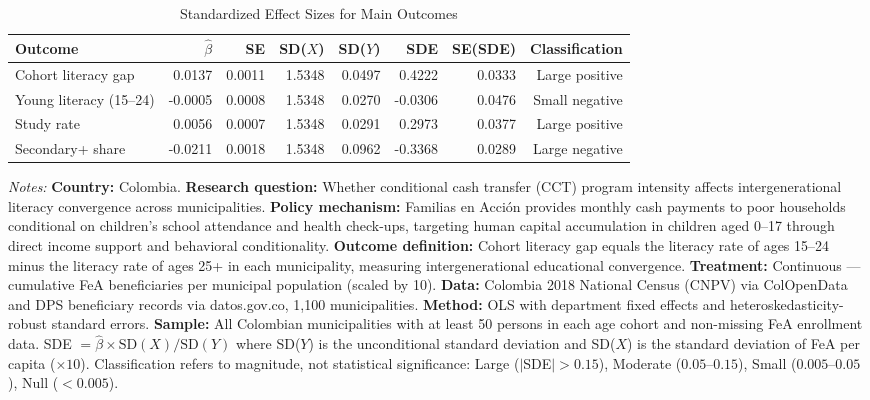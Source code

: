 \begin{table}[H]
\centering
\caption{Standardized Effect Sizes for Main Outcomes}
\label{tab:sde}
\begin{adjustbox}{max width=\textwidth}
\begin{threeparttable}
\begin{tabular}{lrrrrrrr}
\toprule
Outcome & $\hat{\beta}$ & SE & SD($X$) & SD($Y$) & SDE & SE(SDE) & Classification \\
\midrule
Cohort literacy gap & 0.0137 & 0.0011 & 1.5348 & 0.0497 & 0.4222 & 0.0333 & Large positive \\
Young literacy (15--24) & -0.0005 & 0.0008 & 1.5348 & 0.0270 & -0.0306 & 0.0476 & Small negative \\
Study rate & 0.0056 & 0.0007 & 1.5348 & 0.0291 & 0.2973 & 0.0377 & Large positive \\
Secondary+ share & -0.0211 & 0.0018 & 1.5348 & 0.0962 & -0.3368 & 0.0289 & Large negative \\
\bottomrule
\end{tabular}
\begin{tablenotes}[flushleft]
\scriptsize
\item \textit{Notes:} \textbf{Country:} Colombia. \textbf{Research question:} Whether conditional cash transfer (CCT) program intensity affects intergenerational literacy convergence across municipalities. \textbf{Policy mechanism:} Familias en Acci\'{o}n provides monthly cash payments to poor households conditional on children's school attendance and health check-ups, targeting human capital accumulation in children aged 0--17 through direct income support and behavioral conditionality. \textbf{Outcome definition:} Cohort literacy gap equals the literacy rate of ages 15--24 minus the literacy rate of ages 25+ in each municipality, measuring intergenerational educational convergence. \textbf{Treatment:} Continuous --- cumulative FeA beneficiaries per municipal population (scaled by 10). \textbf{Data:} Colombia 2018 National Census (CNPV) via ColOpenData and DPS beneficiary records via datos.gov.co, 1,100 municipalities. \textbf{Method:} OLS with department fixed effects and heteroskedasticity-robust standard errors. \textbf{Sample:} All Colombian municipalities with at least 50 persons in each age cohort and non-missing FeA enrollment data. SDE $= \hat{\beta} \times \text{SD}(X) / \text{SD}(Y)$ where SD($Y$) is the unconditional standard deviation and SD($X$) is the standard deviation of FeA per capita ($\times 10$). Classification refers to magnitude, not statistical significance: Large ($|$SDE$| > 0.15$), Moderate ($0.05$--$0.15$), Small ($0.005$--$0.05$), Null ($< 0.005$).
\end{tablenotes}
\end{threeparttable}
\end{adjustbox}
\end{table}
